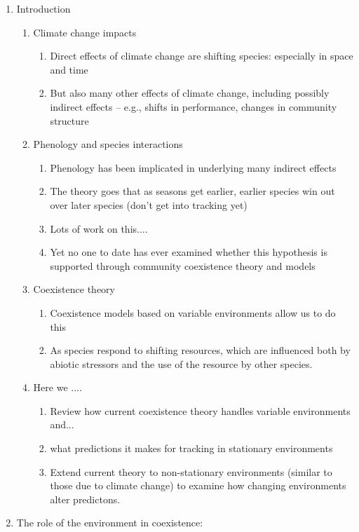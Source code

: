 \documentclass[11pt,letterpaper]{article}
\begin{document}
\begin{enumerate}
\item Introduction
\begin{enumerate}
\item Climate change impacts
\begin{enumerate}
\item Direct effects of climate change are shifting species: especially in space and time
\item But also many other effects of climate change, including possibly indirect effects -- e.g., shifts in performance, changes in community structure
\end{enumerate}
\item Phenology and species interactions
\begin{enumerate}
\item Phenology has been implicated in underlying many indirect effects
\item The theory goes that as seasons get earlier, earlier species win out over later species (don't get into tracking yet)
\item Lots of work on this....
\item Yet no one to date has ever examined whether this hypothesis is supported through community coexistence theory and models
\end{enumerate}
\item Coexistence theory
\begin{enumerate}
\item Coexistence models based on variable environments allow us to do this
\item As species respond to shifting resources, which are
influenced both by abiotic stressors and the use of the resource by
other species.
\end{enumerate}
\item Here we ....
\begin{enumerate}
\item Review how current coexistence theory handles variable environments and... 
\item what predictions it makes for tracking in stationary environments
\item Extend current theory to non-stationary environments (similar to those due to climate change) to examine how changing environments alter predictons.
\end{enumerate}
\end{enumerate}
\item The role of the environment in coexistence:

\end{enumerate}
\end{document}
